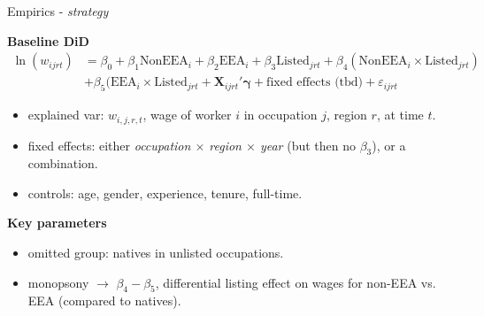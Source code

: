\documentclass[aspectratio=169,10pt,xcolor={dvipsnames}]{beamer}
\begin{document}
\begin{frame}{Empirics - \textit{strategy}}
\label{DiD}

\alert{\textbf{Baseline DiD}}
\begin{align*}
\ln(w_{ijrt}) &= \beta_0 + \beta_1 \text{NonEEA}_{i} + \beta_2 \text{EEA}_{i} + \beta_3 \text{Listed}_{jrt} 
+ \beta_4 (\text{NonEEA}_{i} \times \text{Listed}_{jrt}) \\ &+ \beta_5 (\text{EEA}_{i} \times \text{Listed}_{jrt} 
+ \mathbf{X}_{ijrt}'\boldsymbol{\gamma} + \text{fixed effects (tbd)}+ \varepsilon_{ijrt}
\end{align*}

\begin{itemize}
	\item \alert{explained var}: $w_{i,j,r,t}$, wage of worker $i$ in occupation $j$, region $r$, at time $t$.
	\item \alert{fixed effects}: either \textit{occupation $\times$ region $\times$ year} (but then no $\beta_3$), or a combination.
	\item \alert{controls}: age, gender, experience, tenure, full-time. 
\end{itemize}
\vspace{0.3cm}

\alert{\textbf{Key parameters}}
\vspace{0.1cm}
\begin{itemize}
	\item omitted group: natives in unlisted occupations.
	\item \alert{monopsony} $\rightarrow$ $\beta_4 - \beta_5$, differential listing effect on wages for non-EEA vs. EEA (compared to natives).
\end{itemize}
\hyperlink{ethnic}{}
\end{frame}
\end{document}
